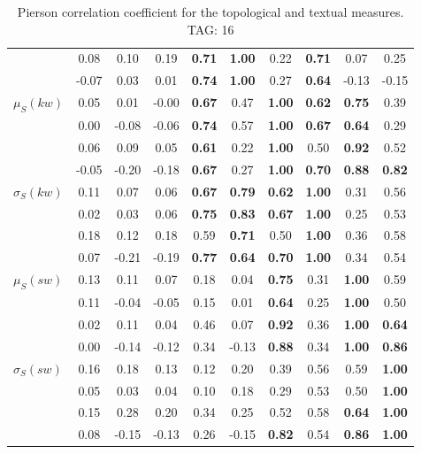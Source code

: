 \begin{table*}[h!]
\begin{center}
\begin{tabular}{| l || c | c | c | c | c | c | c | c | c |}
 & 0.08 & 0.10 & 0.19 & {\bf 0.71} & {\bf 1.00} & 0.22 & {\bf 0.71} & 0.07 & 0.25 \\
 & -0.07 & 0.03 & 0.01 & {\bf 0.74} & {\bf 1.00} & 0.27 & {\bf 0.64} & -0.13 & -0.15 \\\hline
$\mu_S(kw)$ & 0.05 & 0.01 & -0.00 & {\bf 0.67} & 0.47 & {\bf 1.00} & {\bf 0.62} & {\bf 0.75} & 0.39 \\
 & 0.00 & -0.08 & -0.06 & {\bf 0.74} & 0.57 & {\bf 1.00} & {\bf 0.67} & {\bf 0.64} & 0.29 \\
 & 0.06 & 0.09 & 0.05 & {\bf 0.61} & 0.22 & {\bf 1.00} & 0.50 & {\bf 0.92} & 0.52 \\
 & -0.05 & -0.20 & -0.18 & {\bf 0.67} & 0.27 & {\bf 1.00} & {\bf 0.70} & {\bf 0.88} & {\bf 0.82} \\\hline
$\sigma_S(kw)$ & 0.11 & 0.07 & 0.06 & {\bf 0.67} & {\bf 0.79} & {\bf 0.62} & {\bf 1.00} & 0.31 & 0.56 \\
 & 0.02 & 0.03 & 0.06 & {\bf 0.75} & {\bf 0.83} & {\bf 0.67} & {\bf 1.00} & 0.25 & 0.53 \\
 & 0.18 & 0.12 & 0.18 & 0.59 & {\bf 0.71} & 0.50 & {\bf 1.00} & 0.36 & 0.58 \\
 & 0.07 & -0.21 & -0.19 & {\bf 0.77} & {\bf 0.64} & {\bf 0.70} & {\bf 1.00} & 0.34 & 0.54 \\\hline
$\mu_S(sw)$ & 0.13 & 0.11 & 0.07 & 0.18 & 0.04 & {\bf 0.75} & 0.31 & {\bf 1.00} & 0.59 \\
 & 0.11 & -0.04 & -0.05 & 0.15 & 0.01 & {\bf 0.64} & 0.25 & {\bf 1.00} & 0.50 \\
 & 0.02 & 0.11 & 0.04 & 0.46 & 0.07 & {\bf 0.92} & 0.36 & {\bf 1.00} & {\bf 0.64} \\
 & 0.00 & -0.14 & -0.12 & 0.34 & -0.13 & {\bf 0.88} & 0.34 & {\bf 1.00} & {\bf 0.86} \\\hline
$\sigma_S(sw)$ & 0.16 & 0.18 & 0.13 & 0.12 & 0.20 & 0.39 & 0.56 & 0.59 & {\bf 1.00} \\
 & 0.05 & 0.03 & 0.04 & 0.10 & 0.18 & 0.29 & 0.53 & 0.50 & {\bf 1.00} \\
 & 0.15 & 0.28 & 0.20 & 0.34 & 0.25 & 0.52 & 0.58 & {\bf 0.64} & {\bf 1.00} \\
 & 0.08 & -0.15 & -0.13 & 0.26 & -0.15 & {\bf 0.82} & 0.54 & {\bf 0.86} & {\bf 1.00} \\\hline
\end{tabular}
\caption{Pierson correlation coefficient for the topological and textual measures. TAG: 16}
\end{center}
\end{table*}